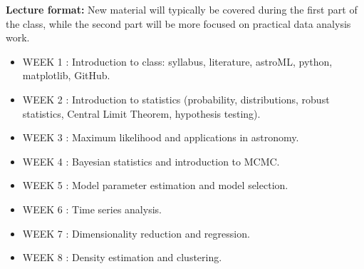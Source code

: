 \documentclass[10pt]{article}
\begin{document}
{\bf Lecture format:}
New material will typically be covered during the first part of the class, while
the second part will be more focused on practical data analysis work. 

\newpage 
\begin{itemize}
\item WEEK 1 : 
      Introduction to class: syllabus, literature, astroML, python, matplotlib, GitHub. 
\item WEEK  2 : Introduction to statistics (probability, distributions, 
             robust statistics, Central Limit Theorem,  hypothesis testing).
\item WEEK  3 :  Maximum likelihood and applications in astronomy.
\item WEEK  4 :  Bayesian statistics and introduction to MCMC.
\item WEEK  5 :  Model parameter estimation and model selection.

\item WEEK  6 :   Time series analysis.

\item WEEK  7 : Dimensionality reduction and regression.


\item WEEK  8 :  Density estimation and clustering.


\end{itemize}
\end{document}
